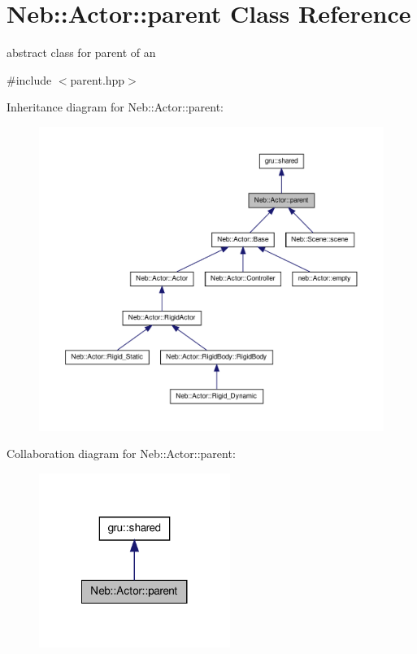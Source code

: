 \hypertarget{classNeb_1_1Actor_1_1parent}{\section{\-Neb\-:\-:\-Actor\-:\-:parent \-Class \-Reference}
\label{classNeb_1_1Actor_1_1parent}
}


abstract class for parent of an   




{\ttfamily \#include $<$parent.\-hpp$>$}



\-Inheritance diagram for \-Neb\-:\-:\-Actor\-:\-:parent\-:\nopagebreak
\begin{figure}[H]
\begin{center}
\leavevmode
\includegraphics[width=350pt]{classNeb_1_1Actor_1_1parent__inherit__graph}
\end{center}
\end{figure}


\-Collaboration diagram for \-Neb\-:\-:\-Actor\-:\-:parent\-:\nopagebreak
\begin{figure}[H]
\begin{center}
\leavevmode
\includegraphics[width=176pt]{classNeb_1_1Actor_1_1parent__coll__graph}
\end{center}
\end{figure}
